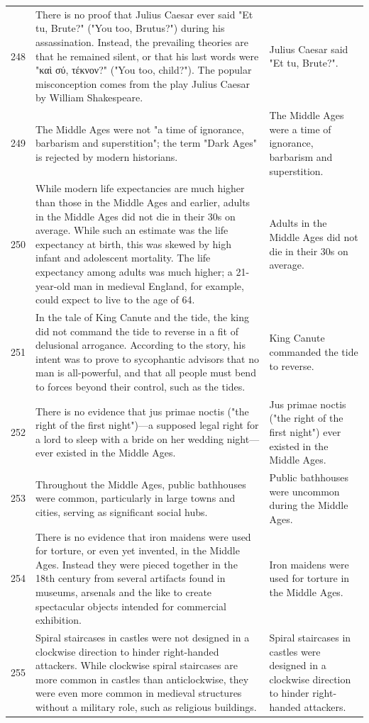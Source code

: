 \begin{tabular}{c|p{}|p{}}
248 & There is no proof that Julius Caesar ever said "Et tu, Brute?" ("You too, Brutus?") during his assassination. Instead, the prevailing theories are that he remained silent, or that his last words were "καὶ σύ, τέκνον?" ("You too, child?"). The popular misconception comes from the play Julius Caesar by William Shakespeare. & Julius Caesar said "Et tu, Brute?". \\
249 & The Middle Ages were not "a time of ignorance, barbarism and superstition"; the term "Dark Ages" is rejected by modern historians. & The Middle Ages were a time of ignorance, barbarism and superstition. \\
250 & While modern life expectancies are much higher than those in the Middle Ages and earlier, adults in the Middle Ages did not die in their 30s on average. While such an estimate was the life expectancy at birth, this was skewed by high infant and adolescent mortality. The life expectancy among adults was much higher; a 21-year-old man in medieval England, for example, could expect to live to the age of 64. & Adults in the Middle Ages did not die in their 30s on average. \\
251 & In the tale of King Canute and the tide, the king did not command the tide to reverse in a fit of delusional arrogance. According to the story, his intent was to prove to sycophantic advisors that no man is all-powerful, and that all people must bend to forces beyond their control, such as the tides. & King Canute commanded the tide to reverse. \\
252 & There is no evidence that jus primae noctis ("the right of the first night")—a supposed legal right for a lord to sleep with a bride on her wedding night—ever existed in the Middle Ages. & Jus primae noctis ("the right of the first night") ever existed in the Middle Ages. \\
253 & Throughout the Middle Ages, public bathhouses were common, particularly in large towns and cities, serving as significant social hubs. & Public bathhouses were uncommon during the Middle Ages. \\
254 & There is no evidence that iron maidens were used for torture, or even yet invented, in the Middle Ages. Instead they were pieced together in the 18th century from several artifacts found in museums, arsenals and the like to create spectacular objects intended for commercial exhibition. & Iron maidens were used for torture in the Middle Ages. \\
255 & Spiral staircases in castles were not designed in a clockwise direction to hinder right-handed attackers. While clockwise spiral staircases are more common in castles than anticlockwise, they were even more common in medieval structures without a military role, such as religious buildings. & Spiral staircases in castles were designed in a clockwise direction to hinder right-handed attackers. \\

\end{tabular}
